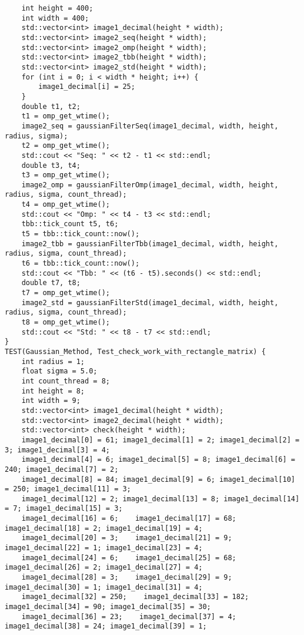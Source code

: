 \documentclass{report}
\begin{document}
\begin{lstlisting}
    int height = 400;
    int width = 400;
    std::vector<int> image1_decimal(height * width);
    std::vector<int> image2_seq(height * width);
    std::vector<int> image2_omp(height * width);
    std::vector<int> image2_tbb(height * width);
    std::vector<int> image2_std(height * width);
    for (int i = 0; i < width * height; i++) {
        image1_decimal[i] = 25;
    }
    double t1, t2;
    t1 = omp_get_wtime();
    image2_seq = gaussianFilterSeq(image1_decimal, width, height, radius, sigma);
    t2 = omp_get_wtime();
    std::cout << "Seq: " << t2 - t1 << std::endl;
    double t3, t4;
    t3 = omp_get_wtime();
    image2_omp = gaussianFilterOmp(image1_decimal, width, height, radius, sigma, count_thread);
    t4 = omp_get_wtime();
    std::cout << "Omp: " << t4 - t3 << std::endl;
    tbb::tick_count t5, t6;
    t5 = tbb::tick_count::now();
    image2_tbb = gaussianFilterTbb(image1_decimal, width, height, radius, sigma, count_thread);
    t6 = tbb::tick_count::now();
    std::cout << "Tbb: " << (t6 - t5).seconds() << std::endl;
    double t7, t8;
    t7 = omp_get_wtime();
    image2_std = gaussianFilterStd(image1_decimal, width, height, radius, sigma, count_thread);
    t8 = omp_get_wtime();
    std::cout << "Std: " << t8 - t7 << std::endl;
}
TEST(Gaussian_Method, Test_check_work_with_rectangle_matrix) {
    int radius = 1;
    float sigma = 5.0;
    int count_thread = 8;
    int height = 8;
    int width = 9;
    std::vector<int> image1_decimal(height * width);
    std::vector<int> image2_decimal(height * width);
    std::vector<int> check(height * width);
    image1_decimal[0] = 61; image1_decimal[1] = 2; image1_decimal[2] = 3; image1_decimal[3] = 4;
    image1_decimal[4] = 6; image1_decimal[5] = 8; image1_decimal[6] = 240; image1_decimal[7] = 2;
    image1_decimal[8] = 84; image1_decimal[9] = 6; image1_decimal[10] = 250; image1_decimal[11] = 3;
    image1_decimal[12] = 2; image1_decimal[13] = 8; image1_decimal[14] = 7; image1_decimal[15] = 3;
    image1_decimal[16] = 6;    image1_decimal[17] = 68; image1_decimal[18] = 2; image1_decimal[19] = 4;
    image1_decimal[20] = 3;    image1_decimal[21] = 9; image1_decimal[22] = 1; image1_decimal[23] = 4;
    image1_decimal[24] = 6;    image1_decimal[25] = 68; image1_decimal[26] = 2; image1_decimal[27] = 4;
    image1_decimal[28] = 3;    image1_decimal[29] = 9; image1_decimal[30] = 1; image1_decimal[31] = 4;
    image1_decimal[32] = 250;    image1_decimal[33] = 182; image1_decimal[34] = 90; image1_decimal[35] = 30;
    image1_decimal[36] = 23;    image1_decimal[37] = 4; image1_decimal[38] = 24; image1_decimal[39] = 1;

\end{lstlisting}
\end{document}
